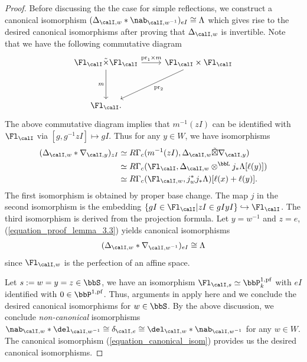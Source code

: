 \documentclass[10pt, reqno]{amsart}
\theoremstyle{plain}
\theoremstyle{definition}
\numberwithin{equation}{section}
\begin{document}
\begin{proof}
		Before discussing the the case for simple reflections, we construct a canonical isomorphism $(\Delta_{\calI,w}\ast\nab_{\calI,w^{-1}})_{eI}\cong \Lambda$ which gives rise to the desired canonical isomorphisms after proving that $\Delta_{\calI,w}$ is invertible.   Note that we have the following commutative diagram
		$$
		\begin{tikzcd}[row sep=huge]
			\Fl_\calI\tilde{\times}\Fl_\calI \arrow[r,"\mathrm{pr}_1\times m"]\arrow [d,"m",swap] & \Fl_\calI\times\Fl_\calI \arrow[dl,"\mathrm{pr}_2"]\\
			\Fl_\calI.
		\end{tikzcd}
		$$   
		The above commutative diagram implies that $m^{-1}(zI)$ can  be  identified  with $\Fl_\calI$ via $[g,g^{-1}zI]\mapsto gI $. Thus for any $y\in W$, we have isomorphisms
		\begin{align}  \label{equation_proof_lemma_3.3}
			\begin{split}        (\Delta_{\calI,w}\ast\nabla_{\calI,y})_{zI} & \simeq R\Gamma_c(m^{-1}(zI),\Delta_{\calI,w}\tilde{\boxtimes}\nabla_{\calI,y}) \\
				& \simeq R\Gamma_c(\Fl_{\calI},\Delta_{\calI,w}\otimes^{\bbL}j_*\Lambda[\ell(y)])\\
				&\simeq R\Gamma_c(\Fl_{\calI,w},j_{w}^*j_*\Lambda)[\ell(x)+\ell(y)].
			\end{split}
		\end{align}  
		The first isomorphism is obtained by proper base change. The map $j$ in the second isomorphism is the embedding $\{gI\in\Fl_\calI\vert zI\in gI yI\}\hookrightarrow \Fl_\calI$. The third isomorphism is derived from the projection formula. Let $y=w^{-1}$ and $z=e$, (\ref{equation_proof_lemma_3.3}) yields canonical isomorphisms
		\begin{align}\label{equation_canonical_isom}
			(\Delta_{\calI,w}\ast\nabla_{\calI,w^{-1}})_{eI}\cong \Lambda
		\end{align}
		since $\Fl_{\calI,w}$ is the perfection of an affine space.
		
		Let $s:=w=y=z\in\bbS$, we have an isomorphism $\Fl_{\calI,s}\simeq \bbP^{1,\mathrm{pf}}_k$ with $eI$ identified with $0\in\bbP^{1,\mathrm{pf}}$. Thus, arguments in \cite[Lemma 4.1.4.(3)]{AR}   apply here and we conclude the desired canonical isomorphisms for $w\in\bbS$. By the above discussion, we conclude \textit{non-canonical} isomorphisms $\nab_{\calI,w}*\del_{\calI,w^{-1}}\cong \delta_{\calI,e} \cong \del_{\calI,w}*\nab_{\calI,w^{-1}}$ for any $w\in W$. The canonical isomorphism (\ref{equation_canonical_isom}) provides us the desired canonical isomorphisms.
		
	\end{proof}
	
\end{document}
